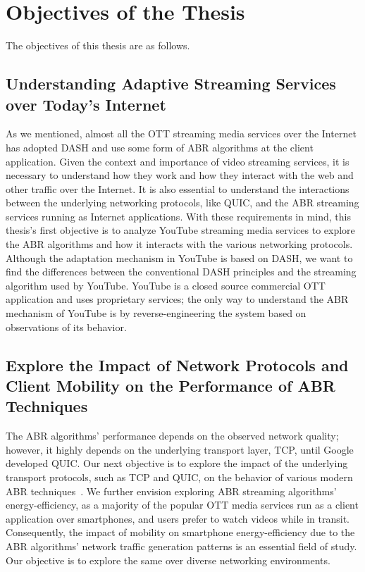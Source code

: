 \section{Objectives of the Thesis}
The objectives of this thesis are as follows. 

\subsection{Understanding Adaptive Streaming Services over Today's Internet}
As we mentioned, almost all the \ac{OTT} streaming media services over the Internet has adopted \ac{DASH} and use some form of \ac{ABR} algorithms at the client application. Given the context and importance of video streaming services, it is necessary to understand how they work and how they interact with the web and other traffic over the Internet. It is also essential to understand the interactions between the underlying networking protocols, like \ac{QUIC}, and the \ac{ABR} streaming services running as Internet applications. With these requirements in mind, this thesis's first objective is to analyze YouTube streaming media services to explore the \ac{ABR} algorithms and how it interacts with the various networking protocols. Although the adaptation mechanism in YouTube is based on \ac{DASH}, we want to find the differences between the conventional \ac{DASH} principles and the streaming algorithm used by YouTube. YouTube is a closed source commercial \ac{OTT} application and uses proprietary services; the only way to understand the \ac{ABR} mechanism of YouTube is by reverse-engineering the system based on observations of its behavior. 

\subsection{Explore the Impact of Network Protocols and Client Mobility on the Performance of ABR Techniques}
The \ac{ABR} algorithms' performance depends on the observed network quality; however, it highly depends on the underlying transport layer, \ac{TCP}, until Google developed \ac{QUIC}. Our next objective is to explore the impact of the underlying transport protocols, such as \ac{TCP} and \ac{QUIC}, on the behavior of various modern \ac{ABR} techniques~\cite{Spiteri2016,mao2017neural}. We further envision exploring \ac{ABR} streaming algorithms' energy-efficiency, as a majority of the popular \ac{OTT} media services run as a client application over smartphones, and users prefer to watch videos while in transit. Consequently, the impact of mobility on smartphone energy-efficiency due to the \ac{ABR} algorithms' network traffic generation patterns is an essential field of study. Our objective is to explore the same over diverse networking environments.  


